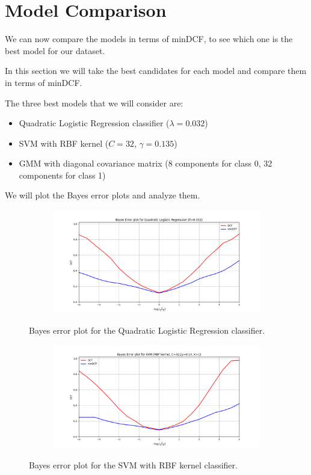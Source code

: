 \documentclass[12pt]{report}
\newcommand{\nnl}{%
    \newline
    \newline
}
\newcommand{\nl}{%
    \newline
    \noindent
}
\begin{document}
\section{Model Comparison}
We can now compare the models in terms of minDCF, to see which one is the best model for our dataset.
\nnl
In this section we will take the best candidates for each model and compare them in terms of minDCF.
\nl
The three best models that we will consider are:
\begin{itemize}
    \item Quadratic Logistic Regression classifier ($\lambda = 0.032$)
    \item SVM with RBF kernel ($C=32$, $\gamma=0.135$)
    \item GMM with diagonal covariance matrix (8 components for class 0, 32 components for class 1)
\end{itemize}
We will plot the Bayes error plots and analyze them.

\begin{figure}[H]
    \centering
    \begin{subfigure}[t]{0.6\textwidth}
        \includegraphics[width=\textwidth]{./plot/model_selection/LogisticRegression.png}
    \end{subfigure}
    \caption{Bayes error plot for the Quadratic Logistic Regression classifier.}
    \label{fig:bayes_error_LR}
\end{figure}

\begin{figure}[H]
    \centering
    \begin{subfigure}[t]{0.6\textwidth}
        \includegraphics[width=\textwidth]{./plot/model_selection/kernelSVM.png}
    \end{subfigure}
    \caption{Bayes error plot for the SVM with RBF kernel classifier.}
    \label{fig:bayes_error_SVM}
\end{figure}
\end{document}
